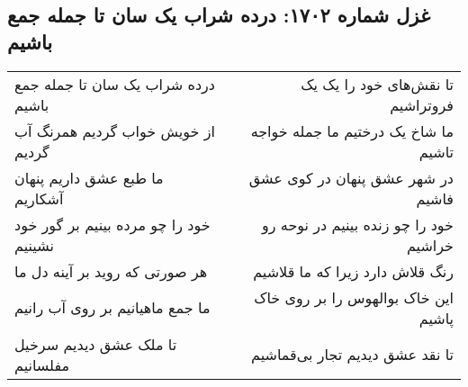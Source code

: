 \begin{center}
\section*{غزل شماره ۱۷۰۲: درده شراب یک سان تا جمله جمع باشیم}
\label{sec:1702}
\begin{longtable}{l p{0.5cm} r}
درده شراب یک سان تا جمله جمع باشیم
&&
تا نقش‌های خود را یک یک فروتراشیم
\\
از خویش خواب گردیم همرنگ آب گردیم
&&
ما شاخ یک درختیم ما جمله خواجه تاشیم
\\
ما طبع عشق داریم پنهان آشکاریم
&&
در شهر عشق پنهان در کوی عشق فاشیم
\\
خود را چو مرده بینیم بر گور خود نشینیم
&&
خود را چو زنده بینیم در نوحه رو خراشیم
\\
هر صورتی که روید بر آینه دل ما
&&
رنگ قلاش دارد زیرا که ما قلاشیم
\\
ما جمع ماهیانیم بر روی آب رانیم
&&
این خاک بوالهوس را بر روی خاک پاشیم
\\
تا ملک عشق دیدیم سرخیل مفلسانیم
&&
تا نقد عشق دیدیم تجار بی‌قماشیم
\\
\end{longtable}
\end{center}
